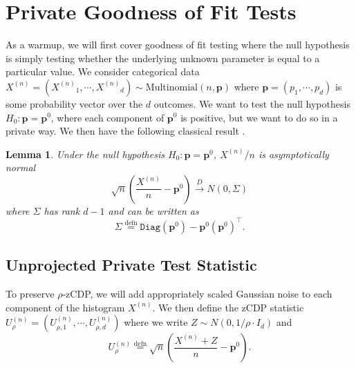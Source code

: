 \documentclass[twoside,letterpaper]{article} \usepackage{aistats2017}
\newtheorem{lemma}[theorem]{Lemma}
\theoremstyle{definition}
\theoremstyle{remark}
\begin{document}
\section{Private Goodness of Fit Tests}\label{sec:gof}
As a warmup, we will first cover goodness of fit testing where the null hypothesis is simply testing whether the underlying unknown parameter is equal to a particular value.  We consider categorical data ${X^{({n})}} = \left({X^{({n})}}_1,\cdots, {X^{({n})}}_d\right) \sim {\mathrm{Multinomial}}(n,{\mathbf{p}})$ where ${\mathbf{p}} = (p_1,\cdots, p_d)$ is some probability vector over the $d$ outcomes.  We want to test the null hypothesis $H_0: {\mathbf{p}} = {{\mathbf{p}}^0}$, where each component of ${{\mathbf{p}}^0}$ is positive, but we want to do so in a private way.  We then have the following classical result \citep{BFH75}.

\begin{lemma}
Under the null hypothesis $H_0: {\mathbf{p}} = {{\mathbf{p}}^0}$, ${X^{({n})}}/n$ is asymptotically normal
$$
\sqrt{n} \left(\frac{{X^{({n})}}}{n} - {{\mathbf{p}}^0}\right) \stackrel{D}{\to} N(0,{\Sigma})
$$
where ${\Sigma}$ has rank $d-1$ and can be written as 
\begin{equation}
{\Sigma} \stackrel{\mathrm{defn}}{=} {\ensuremath{\mathtt{Diag}}}({{\mathbf{p}}^0}) - {{\mathbf{p}}^0} ({{\mathbf{p}}^0})^\intercal.
\label{eq:Sigma}
\end{equation}
\end{lemma}

\subsection{Unprojected Private Test Statistic}
To preserve $\rho$-zCDP, we will add appropriately scaled Gaussian noise to each component of the histogram ${X^{({n})}}$.  We then define the zCDP statistic ${U^{(n)}_{{\rho}}} = \left({U^{(n)}_{{\rho},{1}}}, \cdots, {U^{(n)}_{{\rho},{d}}} \right)$ where we write $Z \sim N\left(0,1/\rho \cdot I_d\right)$ and
\begin{equation}
{U^{(n)}_{{\rho}}} \stackrel{\mathrm{defn}}{=} \sqrt{n}\left( \frac{{X^{({n})}} + Z}{n} - {{\mathbf{p}}^0}\right).
\label{eq:UzCDP}
\end{equation}
\end{document}
